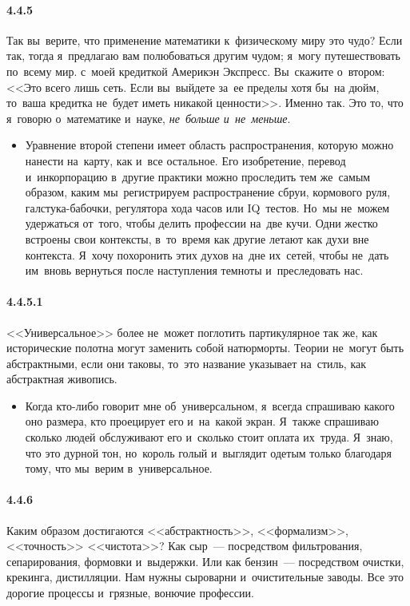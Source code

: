 \paragraph{4.4.5}\hypertarget{par:4.4.5}{} Так вы~верите, что применение математики к~физическому миру это чудо? Если так, тогда я~предлагаю вам полюбоваться другим чудом; я~могу путешествовать по~всему мир. с~моей кредиткой Америкэн Экспресс. Вы~скажите о~втором: <<Это всего лишь сеть. Если вы~выйдете за~ее пределы хотя бы~на дюйм, то~ваша кредитка не~будет иметь никакой ценности>>. Именно так. Это то, что я~говорю о~математике и~науке, {\itshape не~больше и~не~меньше}. 
	\begin{itemize}
	\item 
	Уравнение второй степени имеет область распространения, которую можно нанести на~карту, как и~все остальное. Его изобретение, перевод и~инкорпорацию в~другие практики можно проследить тем же~самым образом, каким мы~регистрируем распространение сбруи, кормового руля, галстука-бабочки, регулятора хода часов или IQ~тестов. Но~мы не~можем удержаться от~того, чтобы делить профессии на~две кучи. Одни жестко встроены свои контексты, в~то~время как другие летают как духи вне контекста. Я~хочу похоронить этих духов на~дне их~сетей, чтобы не~дать им~вновь вернуться после наступления темноты и~преследовать нас.
	\end{itemize}	

\paragraph{4.4.5.1}\hypertarget{par:4.4.5.1}{} <<Универсальное>> более не~может поглотить партикулярное так же, как исторические полотна могут заменить собой натюрморты. Теории не~могут быть абстрактными, если они таковы, то~это название указывает на~стиль, как абстрактная живопись. 
	\begin{itemize}
	\item 
	Когда кто-либо говорит мне об~универсальном, я~всегда спрашиваю какого оно размера, кто проецирует его и~на~какой экран. Я~также спрашиваю сколько людей обслуживают его и~сколько стоит оплата их~труда. Я~знаю, что это дурной тон, но~король голый и~выглядит одетым только благодаря тому, что мы~верим в~универсальное.
	\end{itemize}	

\paragraph{4.4.6}\hypertarget{par:4.4.6}{} Каким образом достигаются <<абстрактность>>, <<формализм>>, <<точность>> <<чистота>>? Как сыр~--- посредством фильтрования, сепарирования, формовки и~выдержки. Или как бензин~--- посредством очистки, крекинга, дистилляции. Нам нужны сыроварни и~очистительные заводы. Все это дорогие процессы и~грязные, вонючие профессии.

